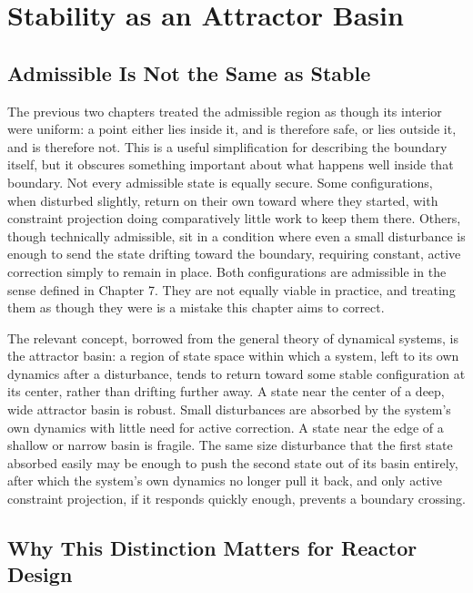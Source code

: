 \chapter{Stability as an Attractor Basin}

\section{Admissible Is Not the Same as Stable}

The previous two chapters treated the admissible region as though its interior were uniform: a point either lies inside it, and is therefore safe, or lies outside it, and is therefore not. This is a useful simplification for describing the boundary itself, but it obscures something important about what happens well inside that boundary. Not every admissible state is equally secure. Some configurations, when disturbed slightly, return on their own toward where they started, with constraint projection doing comparatively little work to keep them there. Others, though technically admissible, sit in a condition where even a small disturbance is enough to send the state drifting toward the boundary, requiring constant, active correction simply to remain in place. Both configurations are admissible in the sense defined in Chapter 7. They are not equally viable in practice, and treating them as though they were is a mistake this chapter aims to correct.

The relevant concept, borrowed from the general theory of dynamical systems, is the attractor basin: a region of state space within which a system, left to its own dynamics after a disturbance, tends to return toward some stable configuration at its center, rather than drifting further away. A state near the center of a deep, wide attractor basin is robust. Small disturbances are absorbed by the system's own dynamics with little need for active correction. A state near the edge of a shallow or narrow basin is fragile. The same size disturbance that the first state absorbed easily may be enough to push the second state out of its basin entirely, after which the system's own dynamics no longer pull it back, and only active constraint projection, if it responds quickly enough, prevents a boundary crossing.

\section{Why This Distinction Matters for Reactor Design}

